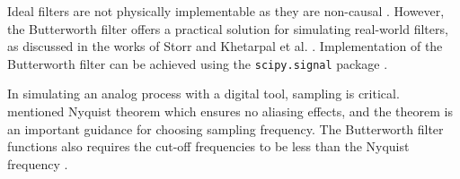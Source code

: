 \documentclass[../ECE459FinalProjectReport.tex]{subfiles}
\begin{document}
Ideal filters are not physically implementable as they are non-causal \cite[p. 428]{kudekiAnalogSignalsSystems2009}. However, the Butterworth filter offers a practical solution for simulating real-world filters, as discussed in the works of Storr \cite{storrButterworthFilterDesign2013} and Khetarpal et al. \cite{khetarpalZaiPythonZhongShiXianDiTongLuBoQi2022}. Implementation of the Butterworth filter can be achieved using the \verb|scipy.signal| package \cite{thescipycommunityScipySignalButter,thescipycommunityScipySignalFiltfilt}.

In simulating an analog process with a digital tool, sampling is critical. \cite[pp. 296--297]{manolakisAppliedDigitalSignal2011} mentioned Nyquist theorem which ensures no aliasing effects, and the theorem is an important guidance for choosing sampling frequency. The Butterworth filter functions also requires the cut-off frequencies to be less than the Nyquist frequency \cite{thescipycommunityScipySignalButter,thescipycommunityScipySignalFiltfilt}.
\end{document}
